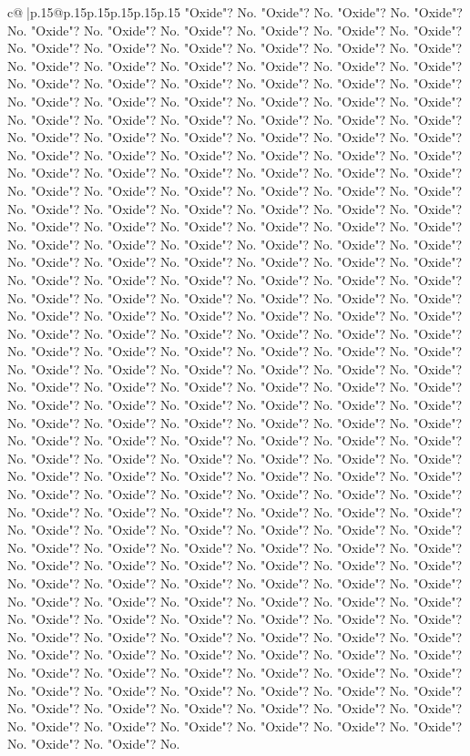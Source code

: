 \documentclass{article}
\begin{document}
{\begin{supertabular}{c@{$\;$}|p{.15\linewidth}@{}p{.15\linewidth}p{.15\linewidth}p{.15\linewidth}p{.15\linewidth}p{.15\linewidth}}
{{{"Oxide"? No. "Oxide"? No. "Oxide"? No. "Oxide"? No. "Oxide"? No. "Oxide"? No. "Oxide"? No. "Oxide"? No. "Oxide"? No. "Oxide"? No. "Oxide"? No. "Oxide"? No. "Oxide"? No. "Oxide"? No. "Oxide"? No. "Oxide"? No. "Oxide"? No. "Oxide"? No. "Oxide"? No. "Oxide"? No. "Oxide"? No. "Oxide"? No. "Oxide"? No. "Oxide"? No. "Oxide"? No. "Oxide"? No. "Oxide"? No. "Oxide"? No. "Oxide"? No. "Oxide"? No. "Oxide"? No. "Oxide"? No. "Oxide"? No. "Oxide"? No. "Oxide"? No. "Oxide"? No. "Oxide"? No. "Oxide"? No. "Oxide"? No. "Oxide"? No. "Oxide"? No. "Oxide"? No. "Oxide"? No. "Oxide"? No. "Oxide"? No. "Oxide"? No. "Oxide"? No. "Oxide"? No. "Oxide"? No. "Oxide"? No. "Oxide"? No. "Oxide"? No. "Oxide"? No. "Oxide"? No. "Oxide"? No. "Oxide"? No. "Oxide"? No. "Oxide"? No. "Oxide"? No. "Oxide"? No. "Oxide"? No. "Oxide"? No. "Oxide"? No. "Oxide"? No. "Oxide"? No. "Oxide"? No. "Oxide"? No. "Oxide"? No. "Oxide"? No. "Oxide"? No. "Oxide"? No. "Oxide"? No. "Oxide"? No. "Oxide"? No. "Oxide"? No. "Oxide"? No. "Oxide"? No. "Oxide"? No. "Oxide"? No. "Oxide"? No. "Oxide"? No. "Oxide"? No. "Oxide"? No. "Oxide"? No. "Oxide"? No. "Oxide"? No. "Oxide"? No. "Oxide"? No. "Oxide"? No. "Oxide"? No. "Oxide"? No. "Oxide"? No. "Oxide"? No. "Oxide"? No. "Oxide"? No. "Oxide"? No. "Oxide"? No. "Oxide"? No. "Oxide"? No. "Oxide"? No. "Oxide"? No. "Oxide"? No. "Oxide"? No. "Oxide"? No. "Oxide"? No. "Oxide"? No. "Oxide"? No. "Oxide"? No. "Oxide"? No. "Oxide"? No. "Oxide"? No. "Oxide"? No. "Oxide"? No. "Oxide"? No. "Oxide"? No. "Oxide"? No. "Oxide"? No. "Oxide"? No. "Oxide"? No. "Oxide"? No. "Oxide"? No. "Oxide"? No. "Oxide"? No. "Oxide"? No. "Oxide"? No. "Oxide"? No. "Oxide"? No. "Oxide"? No. "Oxide"? No. "Oxide"? No. "Oxide"? No. "Oxide"? No. "Oxide"? No. "Oxide"? No. "Oxide"? No. "Oxide"? No. "Oxide"? No. "Oxide"? No. "Oxide"? No. "Oxide"? No. "Oxide"? No. "Oxide"? No. "Oxide"? No. "Oxide"? No. "Oxide"? No. "Oxide"? No. "Oxide"? No. "Oxide"? No. "Oxide"? No. "Oxide"? No. "Oxide"? No. "Oxide"? No. "Oxide"? No. "Oxide"? No. "Oxide"? No. "Oxide"? No. "Oxide"? No. "Oxide"? No. "Oxide"? No. "Oxide"? No. "Oxide"? No. "Oxide"? No. "Oxide"? No. "Oxide"? No. "Oxide"? No. "Oxide"? No. "Oxide"? No. "Oxide"? No. "Oxide"? No. "Oxide"? No. "Oxide"? No. "Oxide"? No. "Oxide"? No. "Oxide"? No. "Oxide"? No. "Oxide"? No. "Oxide"? No. "Oxide"? No. "Oxide"? No. "Oxide"? No. "Oxide"? No. "Oxide"? No. "Oxide"? No. "Oxide"? No. "Oxide"? No. "Oxide"? No. "Oxide"? No. "Oxide"? No. "Oxide"? No. "Oxide"? No. "Oxide"? No. "Oxide"? No. "Oxide"? No. "Oxide"? No. "Oxide"? No. "Oxide"? No. "Oxide"? No. "Oxide"? No. "Oxide"? No. "Oxide"? No. "Oxide"? No. "Oxide"? No. "Oxide"? No. "Oxide"? No. "Oxide"? No. "Oxide"? No. "Oxide"? No. "Oxide"? No. "Oxide"? No. "Oxide"? No. "Oxide"? No. "Oxide"? No. "Oxide"? No. "Oxide"? No. "Oxide"? No. "Oxide"? No. "Oxide"? No. "Oxide"? No. "Oxide"? No. "Oxide"? No. "Oxide"? No. "Oxide"? No. "Oxide"? No. "Oxide"? No. "Oxide"? No. "Oxide"? No. "Oxide"? No. "Oxide"? No. "Oxide"? No. "Oxide"? No. "Oxide"? No. "Oxide"? No. "Oxide"? No. "Oxide"? No. "Oxide"? No. "Oxide"? No. "Oxide"? No. "Oxide"? No. "Oxide"? No. "Oxide"? No. "Oxide"? No. "Oxide"? No. "Oxide"? No. "Oxide"? No. "Oxide"? No. "Oxide"? No. }}}
\end{supertabular}}
\end{document}
